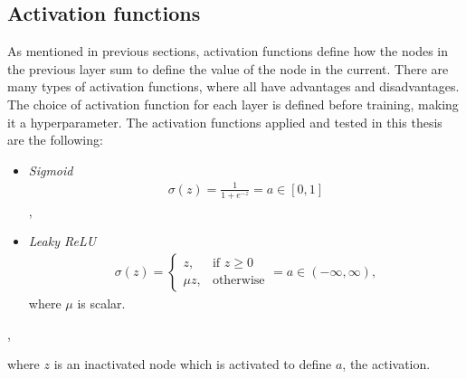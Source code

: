 \subsection{Activation functions}
As mentioned in previous sections, activation functions define how the nodes in the previous layer 
sum to define the value of the node in the current. There are many types of activation functions, 
where all have advantages and disadvantages. The choice of activation function for each layer is defined
before training, making it a hyperparameter. The activation functions applied and tested in this thesis are the following:
\begin{center}
\begin{itemize}
    \item  \emph{Sigmoid}\\  
    \begin{align*}
         \sigma{(z)} = \frac{1}{1+e^{-z}} = a \in [0,1]
    \end{align*},
    \item \emph{Leaky ReLU}
    \begin{align*}
        \sigma{(z)} = 
        \begin{cases}
            z,& \text{if } z\geq 0\\
            \mu z,              & \text{otherwise}
        \end{cases}
        = a \in (-\infty, \infty),
   \end{align*}
   where $\mu$ is scalar.
\end{itemize},
\end{center}
where $z$ is an inactivated node which is activated to define $a$, the activation.

